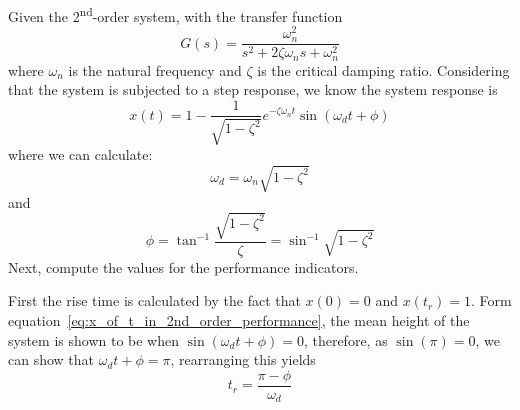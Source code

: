 \documentclass[12pt,letter]{article}
\numberwithin{ex}{section} %
\numberwithin{re}{section} %
\numberwithin{equation}{section}	%
\begin{document}
Given the 2\textsuperscript{nd}-order system, with the transfer function
\begin{equation}
G(s) = \frac{\omega_n^2}{s^2 + 2 \zeta \omega_n s + \omega_n^2}
\end{equation}
where $\omega_n$ is the natural frequency and $\zeta$ is the critical damping ratio. Considering that the system is subjected to a step response, we know the system response is
\begin{equation}
x(t) = 1 - \frac{1}{\sqrt{1-\zeta^2}} e^{-\zeta \omega_n t} \sin (\omega_d t + \phi)
\label{eq:x_of_t_in_2nd_order_performance}
\end{equation}
where we can calculate:
\begin{equation}
\omega_d = \omega_n \sqrt{1-\zeta^2}
\end{equation}
and
\begin{equation}
\phi = \tan^{-1} \frac{\sqrt{1-\zeta^2}}{\zeta} = \sin^{-1} \sqrt{1-\zeta^2}
\label{eq:tan_in_performance_indicators}
\end{equation}
Next, compute the values for the performance indicators. 

First the rise time is calculated by the fact that $x(0) = 0$ and $x(t_r)=1$. Form equation~\ref{eq:x_of_t_in_2nd_order_performance}, the mean height of the system is shown to be when $ \sin (\omega_d t + \phi) = 0$, therefore, as $\sin(\pi)=0$, we can show that $\omega_d t + \phi = \pi$, rearranging this yields 
\begin{equation}
t_r = \frac{\pi - \phi}{\omega_d}
\end{equation}
\end{document}
